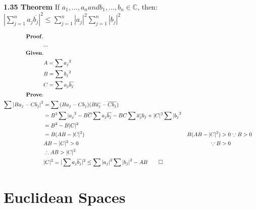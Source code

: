 \documentclass{article}
\newcommand{\THEOREM}[1]{
  \label{theorem-#1}
  {\noindent \bf #1 Theorem}
}
\begin{document}
  \THEOREM{1.35} If $ a_1, ..., a_n and b_1, ..., b_n \in \mathbb{C} $, then: \\
  {\indent} $ |\sum_{j=1}^n a_j\overline{b_j}|^2 \leq \sum_{j=1}^n |a_j|^2 \sum_{j=1}^n |b_j|^2$

  \pagebreak

  \begin{align*}
    {\bf Proof.}  \\
      & ...       \\
    {\bf Given.}  \\
      & A = \sum{a_j}^2 \\
      & B = \sum{b_j}^2 \\
      & C = \sum{a_j\overline{b_j}} \\
    {\bf Prove.}  \\
      \sum{|B a_j - C b_j|}^2 & = \sum{(B a_j - C b_j)(B\overline{a_j} - \overline{C b_j})} \\
      & = B^2 \sum{|a_j}^2 - B \overline{C} \sum{a_j\overline{b_j}} - B C \sum{\overline{a_j} b_j} + |C|^2 \sum{|b_j}^2 \\
      & = B^2 - B |C|^2 \\
      & = B (AB - |C|^2)
      & B (AB - |C|^2) > 0  & \because B>0  \\
      & AB - |C|^2 > 0      & \because B>0  \\
      & \therefore AB > |C|^2               \\
      & |C|^2 = |\sum{a_j\overline{b_j}}|^2 \leq \sum{|a_j|}^2\sum{|b_j|}^2 - AB \qed \\
  \end{align*}

  \section{Euclidean Spaces}
\end{document}
